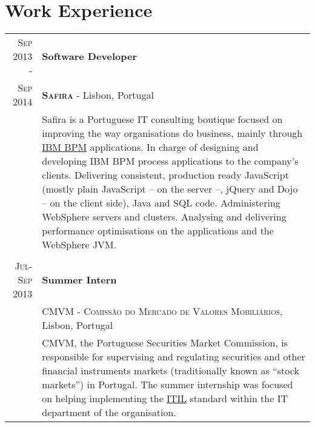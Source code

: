 \documentclass[a4paper,10pt]{article}
\begin{document}
\section{Work Experience}
\begin{tabular}{r|p{11.5cm}}
 \textsc{Sep 2013 -} & \textbf{Software Developer}\\
 \textsc{Sep 2014} & \textbf{\textsc{Safira}} - Lisbon, Portugal \\
 & \footnotesize{Safira is a Portuguese IT consulting boutique focused on improving the way organisations do business, mainly through \href{http://www-03.ibm.com/software/products/en/business-process-manager-family}{IBM BPM} applications. In charge of designing and developing IBM BPM process applications to the company's clients. Delivering consistent, production ready JavaScript (mostly plain JavaScript -- on the server --, jQuery and Dojo -- on the client side), Java and SQL code. Administering WebSphere servers and clusters. Analysing and delivering performance optimisations on the applications and the WebSphere JVM.}\\\multicolumn{2}{c}{} \\
 \textsc{Jul-Sep 2013} & \textbf{Summer Intern} \\
 & \textsc{CMVM - Comissão do Mercado de Valores Mobiliários}, Lisbon, Portugal \\
&\footnotesize{CMVM, the Portuguese Securities Market Commission, is responsible for supervising and regulating securities and other financial instruments markets (traditionally known as ``stock markets'') in Portugal. The summer internship was focused on helping implementing the \href{http://www.itil-officialsite.com/}{ITIL} standard within the IT department of the organisation.}
\end{tabular}

\end{document}
